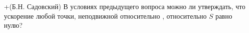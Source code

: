 +(Б.Н. Садовский)
В условиях предыдущего вопроса можно ли утверждать, что ускорение
любой точки, неподвижной относительно  , относительно $S$ равно нулю?
